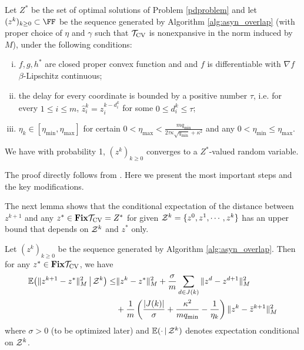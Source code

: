 {\begin{thm}\label{thm:async-convergence2}
Let $Z^*$ be the set of optimal solutions of Problem \eqref{pdproblem} and let $(z^k)_{k\geq0}\subset \FF$ be the sequence generated by Algorithm \ref{alg:asyn_overlap} (with proper choice of $\eta$ and $\gamma$ such that ${{\mathcal{T}}_{\textnormal{CV}}}$ is nonexpansive in the norm induced by $M$), under the following conditions:
\begin{enumerate}[(i)]
\item $f,g,h^*$ are closed proper convex function and and $f$ is differentiable with $\nabla f$ $\beta$-Lipschitz continuous;
\item the delay for every coordinate is bounded by a positive number $\tau$, i.e. for every $1\leq i\leq m$, $\hat{z}^{k}_{i}=z_i^{k-d_{i}^k}$ for some $0\leq d_{i}^k\leq\tau$;
\item $\eta_k
\in [\eta_{\min}, \eta_{\max}]$ for certain $0<\eta_{\max}<\frac{mq_{\min}}{2\tau\kappa
\sqrt{q_{\min}}+\kappa^2}$ and any $0<\eta_{\min}\leq\eta_{\max}$.
\end{enumerate}
We have with probability 1, $(z^k)_{k\geq 0}$ converges to a $Z^*$-valued random variable.
\end{thm} 
The proof directly follows from \cite[Section 3]{Peng_2015_AROCK}. Here we present the most important steps and the key modifications. 
 
The next lemma shows that the conditional expectation of the distance between $z^{k+1}$ 
and any $z^*\in \mathbf{Fix} {{\mathcal{T}}_{\textnormal{CV}}}=Z^*$ for given ${\mathcal{Z}}^k=\{z^0,z^1,\cdots,z^k\}$ has an
upper bound that depends on ${\mathcal{Z}}^k$ and $z^*$ only.
\begin{lemma}\label{lemma:fund}
Let $(z^k)_{k\geq 0}$ be the sequence generated by Algorithm
\ref{alg:asyn_overlap}.  Then for
any $z^*\in \mathbf{Fix} {{\mathcal{T}}_{\textnormal{CV}}}$, we have
\begin{align}\label{eqn:fund_inquality0}
\begin{aligned}
\mathbb{E}\big(\|z^{k+1} - z^* \|_M^2 \,\big|\, \cZ^k\big)  \leq & \|z^{k} - z^*
\|_M^2  +{\sigma\over m}\sum_{d\in J(k)}\|z^d-z^{d+1}\|_M^2\\
&+ {1\over m}\left({{|J(k)|}\over \sigma}+{\kappa^2\over
mq_{\min}}-{1\over \eta_k}\right)\|z^k-\bar z^{k+1}\|_M^2
\end{aligned}
\end{align}
where $\sigma>0$ (to be optimized later) and $\mathbb{E}(\cdot\,|\,{\mathcal{Z}}^k)$ denotes expectation  conditional on ${\mathcal{Z}}^k$.
\end{lemma}

}
